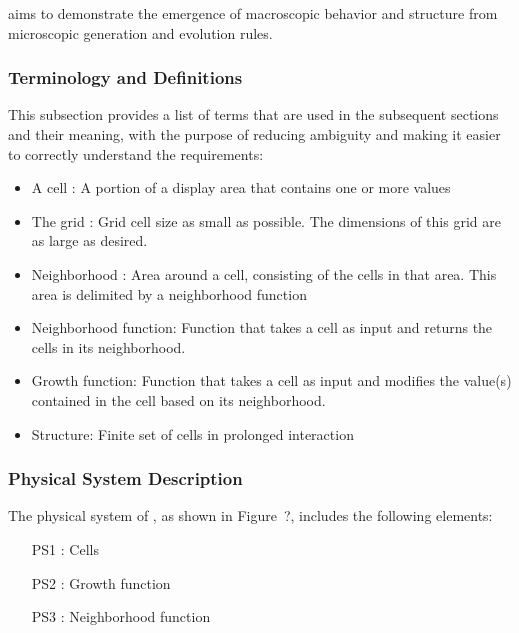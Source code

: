 \documentclass[12pt]{article}
\begin{document}
\progname{} aims to demonstrate the emergence of macroscopic behavior and structure from microscopic generation and evolution rules.

\subsubsection{Terminology and  Definitions}

This subsection provides a list of terms that are used in the subsequent
sections and their meaning, with the purpose of reducing ambiguity and making it
easier to correctly understand the requirements:

\begin{itemize}

\item A cell : A portion of a display area that contains one or more values

\item The grid : Grid cell size as small as possible. The dimensions of this grid are as large as desired.

\item Neighborhood : Area around a cell, consisting of the cells in that area. This area is delimited by a neighborhood function

\item Neighborhood function: Function that takes a cell as input and returns the cells in its neighborhood.

\item Growth function: Function that takes a cell as input and modifies the value(s) contained in the cell based on its neighborhood.

\item Structure: Finite set of cells in prolonged interaction

\end{itemize}

\subsubsection{Physical System Description} \label{sec_phySystDescrip}

The physical system of \progname{}, as shown in Figure~?, includes the following elements:

\begin{itemize}

\item[PS1 :] Cells

\item[PS2 :] Growth function

\item[PS3 :] Neighborhood function

\end{itemize}
\end{document}
